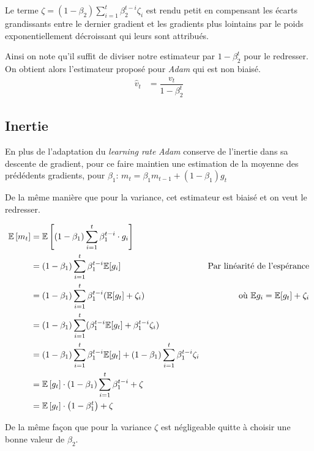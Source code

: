 \documentclass[fleqn,11pt, titlepage, french]{article}
\begin{document}
	Le terme $\zeta = (1-\beta_2)\sum_{i=1}^{t} \beta_{2}^{t-i}\zeta_i$ est rendu petit en compensant les écarts grandissants entre le dernier gradient et les gradients plus lointains par le poids exponentiellement décroissant qui leurs sont attribués.
	
	Ainsi on note qu'il suffit de diviser notre estimateur par $1-\beta_{2}^{t}$ pour le redresser. On obtient alors l'estimateur proposé pour \emph{Adam} qui est non biaisé.
	\begin{align*}
		\hat{v}_t &= \dfrac{v_t}{1 - \beta^t_2}
	\end{align*}
	
	\subsection{Inertie}
	
	En plus de l'adaptation du \emph{learning rate} \emph{Adam} conserve de l'inertie dans sa descente de gradient, pour ce faire maintien une estimation de la moyenne des prédédents gradients, pour $\beta_1$: $m_t = \beta_1 m_{t-1} + (1-\beta_1) g_t$
	
	De la même manière que pour la variance, cet estimateur est biaisé et on veut le redresser.
	
	\begin{align*} 
	\mathbb{E}\left[m_{t}\right] &=\mathbb{E}\left[\left(1-\beta_{1}\right) \sum_{i=1}^{t} \beta_{1}^{t-i} \cdot g_{i}\right] \\ 
	&=\left(1-\beta_{1}\right) \sum_{i=1}^{t} \beta_{1}^{t-i}  \mathbb{E} [g_{i}] &\text{Par linéarité de l'espérance} \\ 
	&=\left(1-\beta_{1}\right) \sum_{i=1}^{t} \beta_{1}^{t-i}  (\mathbb{E} [g_{t}] + \zeta_i)  		&\text{où $\mathbb{E} g_{i} = \mathbb{E}[g_{t}] + \zeta_i$} \\
	&=\left(1-\beta_{1}\right) \sum_{i=1}^{t} (\beta_{1}^{t-i}  \mathbb{E} [g_{t}] + \beta_{1}^{t-i} \zeta_i) \\
	&=\left(1-\beta_{1}\right) \sum_{i=1}^{t} \beta_{1}^{t-i}  \mathbb{E} [g_{t}] + \left(1-\beta_{1}\right) \sum_{i=1}^{t} \beta_{1}^{t-i} \zeta_i \\
	&=\mathbb{E}\left[g_{t}\right] \cdot\left(1-\beta_{1}\right) \sum_{i=1}^{t} \beta_{1}^{t-i}+\zeta \\ 
	&=\mathbb{E}\left[g_{t}\right] \cdot\left(1-\beta_{1}^{t}\right)+\zeta
	\end{align*}
	
	De la même façon que pour la variance $\zeta$ est négligeable quitte à choisir une bonne valeur de $\beta_{2}$.
	
\end{document}
